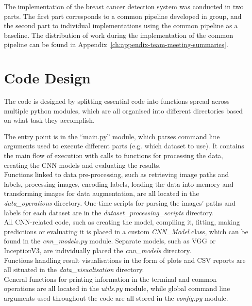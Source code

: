 The implementation of the breast cancer detection system was conducted in two parts. The first part corresponds to a common pipeline developed in group, and the second part to individual implementations using the common pipeline as a baseline. The distribution of work during the implementation of the common pipeline can be found in Appendix~\ref{ch:appendix-team-meeting-summaries}.


\section{Code Design}

The code is designed by splitting essential code into functions spread across multiple python modules, which are all organised into different directories based on what task they accomplish.

The entry point is in the ``main.py'' module, which parses command line arguments used to execute different parts (e.g. which dataset to use). It contains the main flow of execution with calls to functions for processing the data, creating the CNN models and evaluating the results.\\

Functions linked to data pre-processing, such as retrieving image paths and labels, processing images, encoding labels, loading the data into memory and transforming images for data augmentation, are all located in the \textit{data\_operations} directory. One-time scripts for parsing the images' paths and labels for each dataset are in the \textit{dataset\_processing\_scripts} directory.\\

All CNN-related code, such as creating the model, compiling it, fitting, making predictions or evaluating it is placed in a custom \textit{CNN\_Model} class, which can be found in the \textit{cnn\_models.py} module. Separate models, such as VGG or InceptionV3, are individually placed the \textit{cnn\_models} directory.\\

Functions handling result visualisations in the form of plots and CSV reports are all situated in the \textit{data\_visualisation} directory.\\

General functions for printing information in the terminal and common operations are all located in the \textit{utils.py} module, while global command line arguments used throughout the code are all stored in the \textit{config.py} module.


